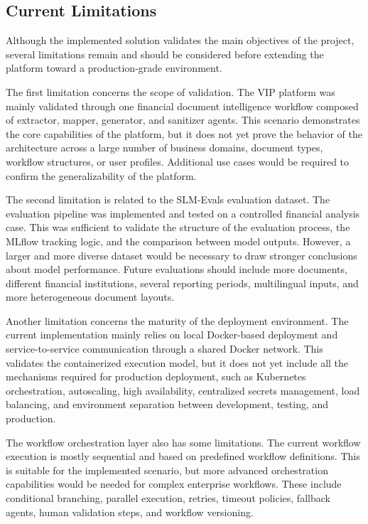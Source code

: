 \subsection{Current Limitations}

Although the implemented solution validates the main objectives of the project, several limitations remain and should be considered before extending the platform toward a production-grade environment.

The first limitation concerns the scope of validation. The VIP platform was mainly validated through one financial document intelligence workflow composed of extractor, mapper, generator, and sanitizer agents. This scenario demonstrates the core capabilities of the platform, but it does not yet prove the behavior of the architecture across a large number of business domains, document types, workflow structures, or user profiles. Additional use cases would be required to confirm the generalizability of the platform.

The second limitation is related to the SLM-Evals evaluation dataset. The evaluation pipeline was implemented and tested on a controlled financial analysis case. This was sufficient to validate the structure of the evaluation process, the MLflow tracking logic, and the comparison between model outputs. However, a larger and more diverse dataset would be necessary to draw stronger conclusions about model performance. Future evaluations should include more documents, different financial institutions, several reporting periods, multilingual inputs, and more heterogeneous document layouts.

Another limitation concerns the maturity of the deployment environment. The current implementation mainly relies on local Docker-based deployment and service-to-service communication through a shared Docker network. This validates the containerized execution model, but it does not yet include all the mechanisms required for production deployment, such as Kubernetes orchestration, autoscaling, high availability, centralized secrets management, load balancing, and environment separation between development, testing, and production.

The workflow orchestration layer also has some limitations. The current workflow execution is mostly sequential and based on predefined workflow definitions. This is suitable for the implemented scenario, but more advanced orchestration capabilities would be needed for complex enterprise workflows. These include conditional branching, parallel execution, retries, timeout policies, fallback agents, human validation steps, and workflow versioning.

